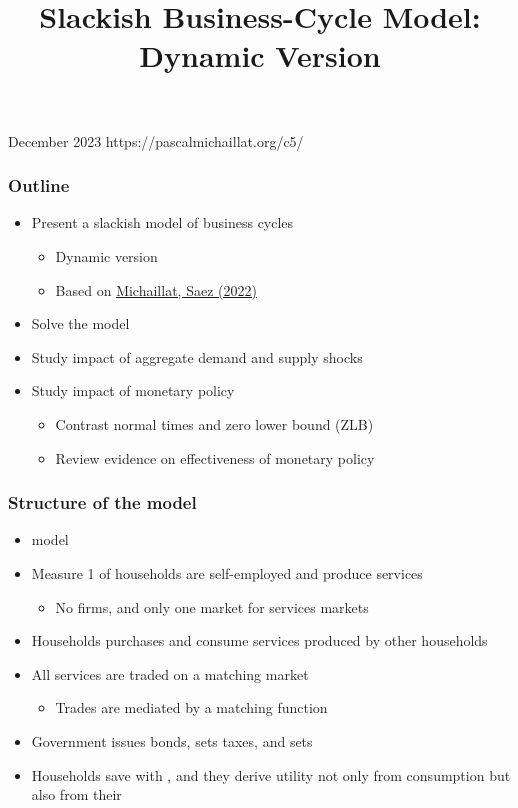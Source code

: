 \documentclass[11pt,aspectratio=169,xcolor={dvipsnames},hyperref={pdftex,pdfpagemode=UseNone,hidelinks,pdfdisplaydoctitle=true},usepdftitle=false]{beamer}
\begin{document}
\title{Slackish Business-Cycle Model: Dynamic Version}
%
{December 2023}%
{https://pascalmichaillat.org/c5/}
\frame{\titlepage}

\begin{frame}
\frametitle{Outline}
\begin{itemize}
\item Present a slackish model of business cycles
\begin{itemize}
\item Dynamic version
\item Based on \href{https://pascalmichaillat.org/7/}{Michaillat, Saez (2022)}
\end{itemize}	
\item Solve the model
\item Study impact of aggregate demand and supply shocks
\item Study impact of monetary policy
\begin{itemize}
\item Contrast normal times and zero lower bound (ZLB)
\item Review evidence on effectiveness of monetary policy
\end{itemize}
\end{itemize}	
\end{frame}

\begin{frame}
\frametitle{Structure of the model}
\begin{itemize}
\item {} model
\item Measure 1 of  households are self-employed and produce services
\begin{itemize}
	\item No firms, and only one market for services markets
\end{itemize}
\item Households purchases and consume services produced by other households
\item All services are traded on a matching market 
\begin{itemize}
	\item Trades are mediated by a  matching function
\end{itemize}
\item Government issues bonds, sets taxes, and sets 
\item Households save with , and they derive utility not only from consumption but also from their 
\end{itemize}	
\end{frame}
\end{document}

